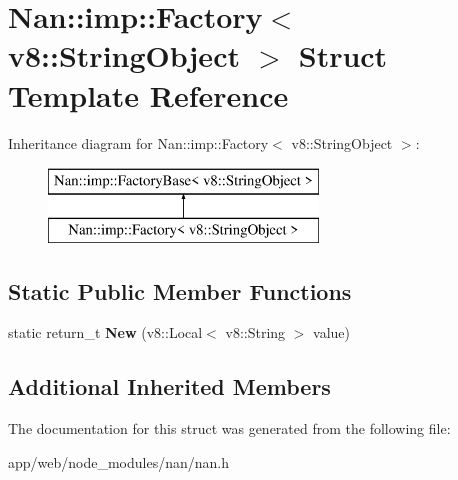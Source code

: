 \hypertarget{struct_nan_1_1imp_1_1_factory_3_01v8_1_1_string_object_01_4}{}\section{Nan\+:\+:imp\+:\+:Factory$<$ v8\+:\+:String\+Object $>$ Struct Template Reference}
\label{struct_nan_1_1imp_1_1_factory_3_01v8_1_1_string_object_01_4}
Inheritance diagram for Nan\+:\+:imp\+:\+:Factory$<$ v8\+:\+:String\+Object $>$\+:\begin{figure}[H]
\begin{center}
\leavevmode
\includegraphics[height=2.000000cm]{struct_nan_1_1imp_1_1_factory_3_01v8_1_1_string_object_01_4}
\end{center}
\end{figure}
\subsection*{Static Public Member Functions}
\begin{DoxyCompactItemize}
\item 
\mbox{\label{struct_nan_1_1imp_1_1_factory_3_01v8_1_1_string_object_01_4_a2118990960d78d7ef165a38436af9192}} 
static return\+\_\+t {\bfseries New} (v8\+::\+Local$<$ v8\+::\+String $>$ value)
\end{DoxyCompactItemize}
\subsection*{Additional Inherited Members}


The documentation for this struct was generated from the following file\+:\begin{DoxyCompactItemize}
\item 
app/web/node\+\_\+modules/nan/nan.\+h\end{DoxyCompactItemize}

